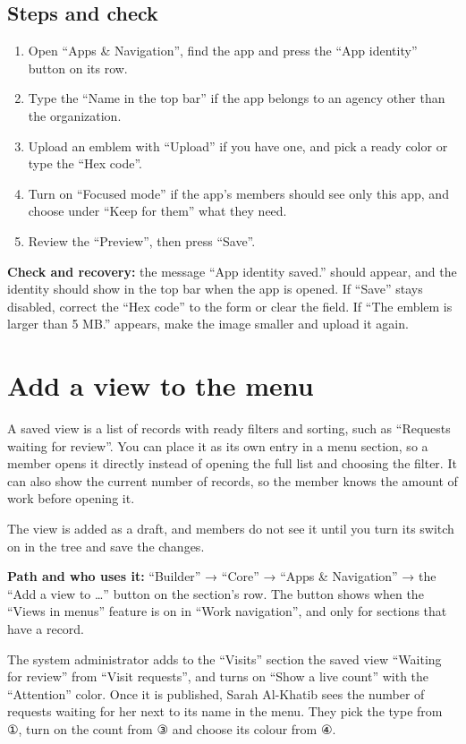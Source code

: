 \subsection{Steps and check}
\begin{enumerate}
\item Open “Apps \& Navigation”, find the app and press the “App identity” button on its row.
\item Type the “Name in the top bar” if the app belongs to an agency other than the organization.
\item Upload an emblem with “Upload” if you have one, and pick a ready color or type the “Hex code”.
\item Turn on “Focused mode” if the app's members should see only this app, and choose under “Keep for them” what they need.
\item Review the “Preview”, then press “Save”.
\end{enumerate}

\textbf{Check and recovery:} the message “App identity saved.” should appear, and the identity should show in the top bar when the app is opened. If “Save” stays disabled, correct the “Hex code” to the form  or clear the field. If “The emblem is larger than 5 MB.” appears, make the image smaller and upload it again.

\clearpage
\section{Add a view to the menu}
\label{sec:builder-feature-navigation-views}

A saved view is a list of records with ready filters and sorting, such as “Requests waiting for review”. You can place it as its own entry in a menu section, so a member opens it directly instead of opening the full list and choosing the filter. It can also show the current number of records, so the member knows the amount of work before opening it.

The view is added as a draft, and members do not see it until you turn its switch on in the tree and save the changes.

\textbf{Path and who uses it:} “Builder” → “Core” → “Apps \& Navigation” → the “Add a view to …” button on the section's row. The button shows when the “Views in menus” feature is on in “Work navigation”, and only for sections that have a record.

\begin{rcnote}
The system administrator adds to the “Visits” section the saved view “Waiting for review” from “Visit requests”, and turns on “Show a live count” with the “Attention” color. Once it is published, Sarah Al-Khatib sees the number of requests waiting for her next to its name in the menu. They pick the type from ①, turn on the count from ③ and choose its colour from ④.
\end{rcnote}

